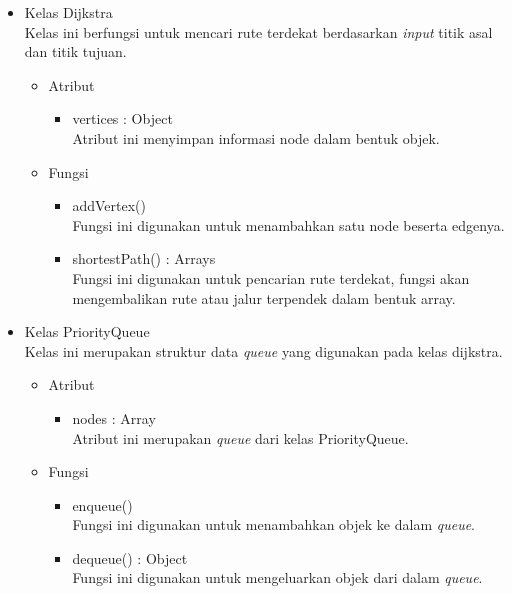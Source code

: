 \begin{itemize}
  \item Kelas Dijkstra\\
  Kelas ini berfungsi untuk mencari rute terdekat berdasarkan \textit{input}
  titik asal dan titik tujuan.
  \begin{itemize}
    \item Atribut
    \begin{itemize}
      \item vertices : Object\\
      Atribut ini menyimpan informasi node dalam bentuk objek.
    \end{itemize}
  \end{itemize}
  \begin{itemize}
    \item Fungsi
    \begin{itemize}
      \item addVertex()\\
      Fungsi ini digunakan untuk menambahkan satu node beserta edgenya.
      
      \item shortestPath() : Arrays\\
      Fungsi ini digunakan untuk pencarian rute terdekat, fungsi akan
      mengembalikan rute atau jalur terpendek dalam bentuk array.
    \end{itemize}
  \end{itemize}
  
  \item Kelas PriorityQueue\\
  Kelas ini merupakan struktur data \textit{queue} yang digunakan pada
  kelas dijkstra.
  \begin{itemize}
    \item Atribut
    \begin{itemize}
      \item nodes : Array\\
      Atribut ini merupakan \textit{queue} dari kelas PriorityQueue.
    \end{itemize}
  \end{itemize}
  \begin{itemize}
    \item Fungsi
    \begin{itemize}
      \item enqueue()\\
      Fungsi ini digunakan untuk menambahkan objek ke dalam \textit{queue}.
      
      \item dequeue() : Object\\
      Fungsi ini digunakan untuk mengeluarkan objek dari dalam \textit{queue}.
      

\end{itemize}
\end{itemize}
\end{itemize}
